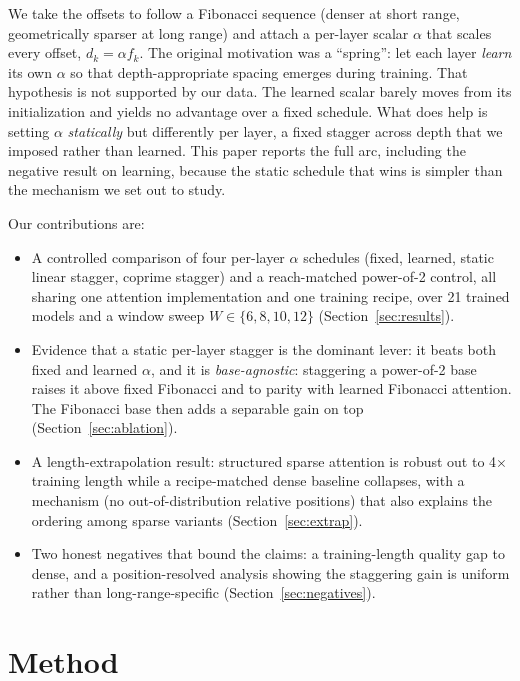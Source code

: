 \documentclass[11pt]{article}
\begin{document}
We take the offsets to follow a Fibonacci sequence (denser at short range,
geometrically sparser at long range) and attach a per-layer scalar $\alpha$
that scales every offset, $d_k = \alpha f_k$. The original motivation was a
``spring'': let each layer \emph{learn} its own $\alpha$ so that depth-appropriate
spacing emerges during training. That hypothesis is not supported by our data.
The learned scalar barely moves from its initialization and yields no advantage
over a fixed schedule. What does help is setting $\alpha$ \emph{statically} but
differently per layer, a fixed stagger across depth that we imposed rather than
learned. This paper reports the full arc, including the negative result on
learning, because the static schedule that wins is simpler than the mechanism we
set out to study.

Our contributions are:
\begin{itemize}
\item A controlled comparison of four per-layer $\alpha$ schedules (fixed,
learned, static linear stagger, coprime stagger) and a reach-matched power-of-2
control, all sharing one attention implementation and one training recipe, over
21 trained models and a window sweep $W \in \{6,8,10,12\}$
(Section~\ref{sec:results}).
\item Evidence that a static per-layer stagger is the dominant lever: it beats
both fixed and learned $\alpha$, and it is \emph{base-agnostic}: staggering a
power-of-2 base raises it above fixed Fibonacci and to parity with learned
Fibonacci attention. The Fibonacci base then adds a separable gain on top
(Section~\ref{sec:ablation}).
\item A length-extrapolation result: structured sparse attention is robust out
to 4$\times$ training length while a recipe-matched dense baseline collapses,
with a mechanism (no out-of-distribution relative positions) that also explains
the ordering among sparse variants (Section~\ref{sec:extrap}).
\item Two honest negatives that bound the claims: a training-length quality gap
to dense, and a position-resolved analysis showing the staggering gain is
uniform rather than long-range-specific (Section~\ref{sec:negatives}).
\end{itemize}

\section{Method}
\label{sec:method}
\end{document}
